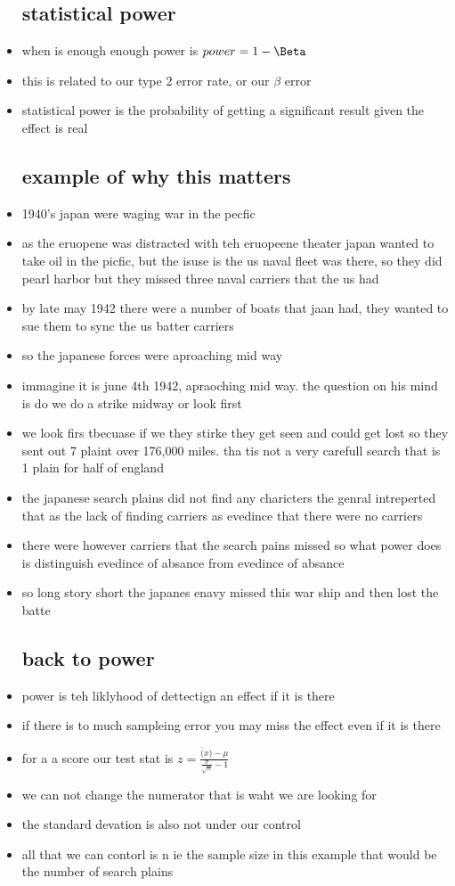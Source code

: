 \documentclass{article}
\begin{document}
\begin{itemize}
\subsection{ statistical power}
\item when is enough enough 
\itme power is $power=1-\Beta$
\item this is related to our type 2 error rate, or our $\beta $ error 
\item statistical power is the probability of getting a significant result given the effect is real
\subsection{example of why this matters}
\item 1940's japan were waging war in the pecfic 
\item as the eruopene was distracted with teh eruopeene theater japan wanted to take oil in the picfic, but the isuse is the us naval fleet was there, so they did pearl harbor 
\itme but they missed three naval carriers that the us had 
\item by late may 1942 there were a number of boats that jaan had, they wanted to sue them to sync the us batter carriers
\item so the japanese forces were aproaching mid way 
\item immagine it is june 4th 1942, apraoching mid way. the question on his mind is do we do a strike midway or look first
\item we look firs tbecuase if we they stirke they get seen and could get lost 
\itme so they sent out 7 plaint over 176,000 miles. tha tis not a very carefull search that is 1 plain for half of england 
\item the japanese search plains did not find any charicters the genral intreperted that as the lack of finding carriers as evedince that there were no carriers
\item there were however carriers that the search pains missed
\itme so what power does is distinguish evedince of absance from evedince of absance 
\item so long story short the japanes enavy missed this war ship and then lost the batte
\subsection{back to power }
\item power is teh liklyhood of dettectign an effect if it is there
\item if there is to much sampleing error you may miss the effect even if it is there 
\item for a a score our test stat is $z=\frac{\bar(x)-\mu}{\frac{\sigma}{\sqrt{n}}-1}$
\item we can not change the numerator that is waht we are looking for 
\item the standard devation is also not under our control 
\item all that we can contorl is n ie the sample size in this example that would be the number of search plains 

\end{itemize}
\end{document}
